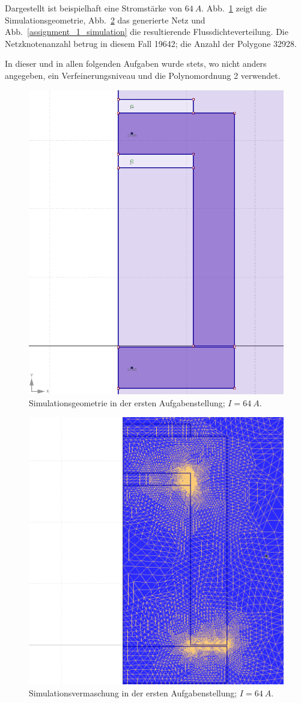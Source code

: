\documentclass[conference,a4paper,twoside]{IEEEtran}
\begin{document}
Dargestellt ist beispielhaft eine Stromstärke von $64\ A$. Abb.~\ref{assignment_1_geometry} zeigt die Simulationsgeometrie, Abb.~\ref{assignment_1_mesh} das generierte Netz und Abb.~\ref{assignment_1_simulation} die resultierende Flussdichteverteilung. Die Netzknotenanzahl betrug in diesem Fall 19642; die Anzahl der Polygone 32928.

In dieser und in allen folgenden Aufgaben wurde stets, wo nicht anders angegeben, ein Verfeinerungsniveau und die Polynomordnung 2 verwendet.

\begin{figure}
\centerline{\includegraphics[width=0.7\columnwidth]{../assets/assignment_1_geometry.png}}
\caption{Simulationsgeometrie in der ersten Aufgabenstellung; $I = 64\ A$.}
\label{assignment_1_geometry}
\end{figure}

\begin{figure}
\centerline{\includegraphics[width=0.7\columnwidth]{../assets/assignment_1_mesh.png}}
\caption{Simulationsvermaschung in der ersten Aufgabenstellung; $I = 64\ A$.}
\label{assignment_1_mesh}
\end{figure}
\end{document}

